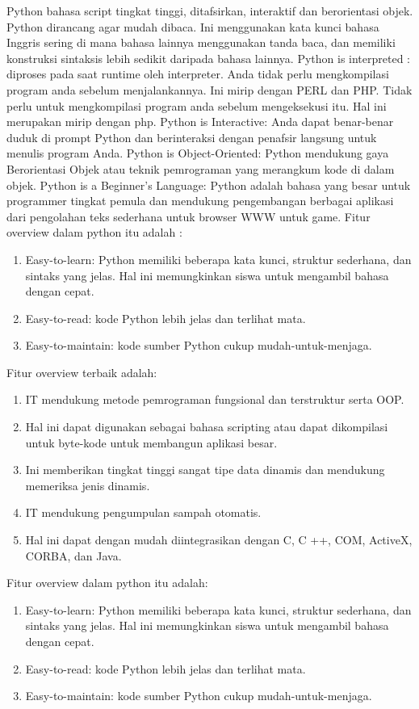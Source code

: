 Python bahasa script tingkat tinggi, ditafsirkan, interaktif dan berorientasi objek. Python dirancang agar mudah dibaca. Ini menggunakan kata kunci bahasa Inggris sering di mana bahasa lainnya menggunakan tanda baca, dan memiliki konstruksi sintaksis lebih sedikit daripada bahasa lainnya.
Python is interpreted : diproses pada saat runtime oleh interpreter. Anda tidak perlu mengkompilasi program anda sebelum menjalankannya. Ini mirip dengan PERL dan PHP.
Tidak perlu untuk mengkompilasi program anda sebelum mengeksekusi itu. Hal ini merupakan mirip dengan php.
Python is Interactive: Anda dapat benar-benar duduk di prompt Python dan berinteraksi dengan penafsir langsung untuk menulis program Anda.
Python is Object-Oriented: Python mendukung gaya Berorientasi Objek atau teknik pemrograman yang merangkum kode di dalam objek.
Python is a Beginner's Language: Python adalah bahasa yang besar untuk programmer tingkat pemula dan mendukung pengembangan berbagai aplikasi dari pengolahan teks sederhana untuk browser WWW untuk game.
Fitur overview dalam python itu adalah :
\begin {enumerate}
\item Easy-to-learn: Python memiliki beberapa kata kunci, struktur sederhana, dan sintaks yang jelas. Hal ini memungkinkan siswa untuk mengambil bahasa dengan cepat.
\item Easy-to-read: kode Python lebih jelas dan terlihat mata.
\item Easy-to-maintain: kode sumber Python cukup mudah-untuk-menjaga.
\end {enumerate}

Fitur overview terbaik adalah:
\begin {enumerate}
\item IT mendukung metode pemrograman fungsional dan terstruktur serta OOP.
\item Hal ini dapat digunakan sebagai bahasa scripting atau dapat dikompilasi untuk byte-kode untuk membangun aplikasi besar.
\item Ini memberikan tingkat tinggi sangat tipe data dinamis dan mendukung memeriksa jenis dinamis.
\item IT mendukung pengumpulan sampah otomatis.
\item Hal ini dapat dengan mudah diintegrasikan dengan C, C ++, COM, ActiveX, CORBA, dan Java.
\end {enumerate}

Fitur overview dalam python itu adalah:
\begin {enumerate}
\item Easy-to-learn: Python memiliki beberapa kata kunci, struktur sederhana, dan sintaks yang jelas. $  $Hal ini memungkinkan siswa untuk mengambil bahasa dengan cepat.
\item Easy-to-read: kode Python lebih jelas dan terlihat mata.
\item Easy-to-maintain: kode sumber Python cukup mudah-untuk-menjaga.
\end {enumerate}

